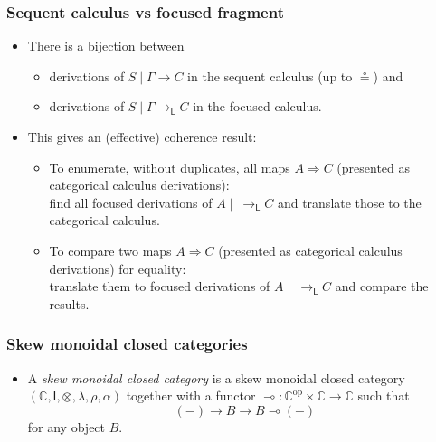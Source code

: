 \documentclass[10pt,t]{beamer}
\newcommand{\I}{\mathsf{I}}
\newcommand{\C}{\mathbb{C}}
\newcommand{\al}{\alpha}
\newcommand{\lam}{\lambda}
\newcommand{\tto}{\Longrightarrow}
\renewcommand{\vdash}{\longrightarrow}
\newcommand{\vdashL}{\vdash_\mathsf{L}}
\newcommand{\lo}{\multimap}
\newcommand{\lolli}{\lo}
\begin{document}

\begin{frame}

\frametitle{Sequent calculus vs focused fragment}

\begin{itemize}

\item There is a bijection between
\begin{itemize}
\item derivations of $S \mid \Gamma \vdash C$
  in the sequent calculus (up to $\circeq$) and 
\item derivations of $S \mid \Gamma \vdashL C$ in the focused calculus.
\end{itemize}

\bigskip

\item This gives an (effective) coherence result:

\begin{itemize}
\item To enumerate, without duplicates, all maps $A \tto C$ (presented as categorical calculus derivations): \\[9pt]

find all focused derivations of
  $A \mid ~ \vdashL C$ and translate those to the categorical calculus.

\medskip

\item To compare two maps $A \tto C$ (presented as categorical calculus
  derivations) for equality: \\[9pt] translate them to focused derivations of
  $A \mid ~ \vdashL C$ and compare the results.


\end{itemize}

\end{itemize}

\end{frame}

\begin{frame}

\frametitle{Skew monoidal closed categories}

\begin{itemize}
\item A \emph{skew monoidal closed category} is a skew monoidal closed
  category $(\C, \I, \otimes, \lam, \rho, \al)$ together with a
  functor $\lolli : \C^{\mathrm{op}} \times \C \to \C$ such that
\[
(-) \to B \vdash B \lolli (-)
\]
for any object $B$.
\end{itemize}

\end{frame}
\end{document}
